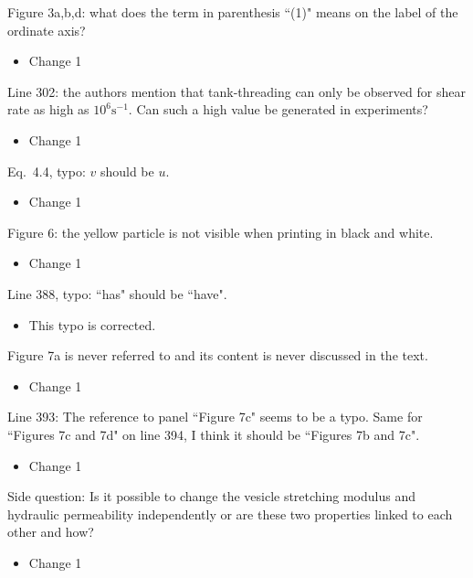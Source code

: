 \documentclass[11pt]{article}
\newcommand{\comment}[1]{{\color{blue} #1}}
\begin{document}
\noindent
\comment{Figure 3a,b,d: what does the term in parenthesis ``(1)" means
on the label of the ordinate axis?}
\begin{itemize}
  \item Change 1 
\end{itemize}

\noindent
\comment{Line 302: the authors mention that tank-threading can only be
observed for shear rate as high as $10^{6}\text{s}^{-1}$. Can such a
high value be generated in experiments?}
\begin{itemize}
  \item Change 1 
\end{itemize}

\noindent
\comment{Eq.~4.4, typo: $v$ should be $u$.}
\begin{itemize}
  \item Change 1 
\end{itemize}

\noindent
\comment{Figure 6: the yellow particle is not visible when printing in
black and white.}
\begin{itemize}
  \item Change 1 
\end{itemize}

\noindent
\comment{Line 388, typo: ``has" should be ``have".}
\begin{itemize}
  \item This typo is corrected.
\end{itemize}

\noindent
\comment{Figure 7a is never referred to and its content is never
discussed in the text.}
\begin{itemize}
  \item Change 1 
\end{itemize}

\noindent
\comment{Line 393: The reference to panel ``Figure 7c" seems to be a typo. Same
for ``Figures 7c and 7d" on line 394, I think it should be ``Figures 7b
and 7c".}
\begin{itemize}
  \item Change 1 
\end{itemize}

\noindent
\comment{Side question: Is it possible to change the vesicle stretching
modulus and hydraulic permeability independently or are these two
properties linked to each other and how?}
\begin{itemize}
  \item Change 1 
\end{itemize}
\end{document}

